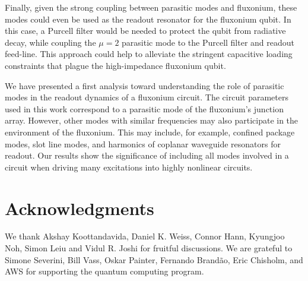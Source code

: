 \documentclass[%
reprint,
superscriptaddress,
 amsmath,amssymb,
 aps,
 prx,
longbibliography,
floatfix,
]{revtex4-2}
\begin{document}
Finally, given the strong coupling between parasitic modes and fluxonium, these modes could even be used as the readout resonator for the fluxonium qubit. In this case, a Purcell filter would be needed to protect the qubit from radiative decay, while coupling the $\mu = 2$ parasitic mode to the Purcell filter and readout feed-line. This approach could help to alleviate the stringent capacitive loading constraints that plague the high-impedance fluxonium qubit.

We have presented a first analysis toward understanding the role of parasitic modes in the readout dynamics of a fluxonium circuit. The circuit parameters used in this work correspond to a parasitic mode of the fluxonium's junction array. However, other modes with similar frequencies may also participate in the environment of the fluxonium. This may include, for example, confined package modes, slot line modes, and harmonics of coplanar waveguide resonators for readout. Our results show the significance of including all modes involved in a circuit when driving many excitations into highly nonlinear circuits.  

\section{Acknowledgments}
 We thank Akshay Koottandavida, Daniel K. Weiss, Connor Hann, Kyungjoo Noh, Simon Leiu and Vidul R. Joshi for fruitful discussions. We are grateful to Simone Severini, Bill Vass, Oskar Painter, Fernando Brand\~ao, Eric Chisholm, and AWS for supporting the quantum computing program. %
\appendix
\end{document}

